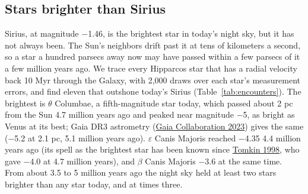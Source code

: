 \documentclass[9pt,twocolumn]{extarticle}
\begin{document}
\subsection{Stars brighter than Sirius}\label{stars-brighter-than-sirius}

Sirius, at magnitude $-$1.46, is the brightest star in today's night sky, but it has not always been. The Sun's neighbors drift past it at tens of kilometers a second, so a star a hundred parsecs away now may have passed within a few parsecs of it a few million years ago. We trace every Hipparcos star that has a radial velocity back 10 Myr through the Galaxy, with 2,000 draws over each star's measurement errors, and find eleven that outshone today's Sirius (Table~\ref{tab:encounters}). The brightest is $\theta$ Columbae, a fifth-magnitude star today, which passed about 2 pc from the Sun 4.7 million years ago and peaked near magnitude $-$5, as bright as Venus at its best; Gaia DR3 astrometry (\protect\hyperlink{cite.gaia2023}{Gaia Collaboration 2023}) gives the same ($-$5.2 at 2.1 pc, 5.1 million years ago). $\varepsilon$ Canis Majoris reached $-$4.35 4.4 million years ago (its spell as the brightest star has been known since \protect\hyperlink{cite.tomkin1998}{Tomkin 1998}, who gave $-$4.0 at 4.7 million years), and $\beta$ Canis Majoris $-$3.6 at the same time. From about 3.5 to 5 million years ago the night sky held at least two stars brighter than any star today, and at times three.
\end{document}

